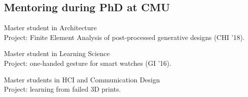 \subsection{Mentoring during PhD at CMU}
 {
	 {
		Master student in Architecture\\
		Project: Finite Element Analysis of post-processed generative designs (CHI '18).
	}
}

 {
	 {
		Master student in Learning Science\\
		Project: one-handed gesture for smart watches (GI '16).
	}
}

 {
	 {
		Master students in HCI and Communication Design\\
		Project: learning from failed 3D prints.
	}
}